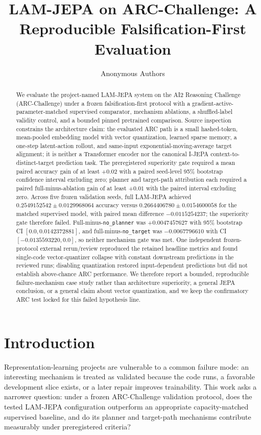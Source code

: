 \documentclass{article}
\title{LAM-JEPA on ARC-Challenge: A Reproducible Falsification-First Evaluation}
\author{Anonymous Authors}
\date{}
\begin{document}
\maketitle

\begin{abstract}
We evaluate the project-named LAM-JEPA system on the AI2 Reasoning Challenge (ARC-Challenge) under a frozen falsification-first protocol with a gradient-active-parameter-matched supervised comparator, mechanism ablations, a shuffled-label validity control, and a bounded pinned pretrained comparison. Source inspection constrains the architecture claim: the evaluated ARC path is a small hashed-token, mean-pooled embedding model with vector quantization, learned sparse memory, a one-step latent-action rollout, and same-input exponential-moving-average target alignment; it is neither a Transformer encoder nor the canonical I-JEPA context-to-distinct-target prediction task. The preregistered superiority gate required a mean paired accuracy gain of at least $+0.02$ with a paired seed-level 95\% bootstrap confidence interval excluding zero; planner and target-path attribution each required a paired full-minus-ablation gain of at least $+0.01$ with the paired interval excluding zero. Across five frozen validation seeds, full LAM-JEPA achieved $0.2549152542 \pm 0.0129968064$ accuracy versus $0.2664406780 \pm 0.0154600058$ for the matched supervised model, with paired mean difference $-0.0115254237$; the superiority gate therefore failed. Full-minus-\texttt{no\_planner} was $+0.0047457627$ with 95\% bootstrap CI $[0.0, 0.0142372881]$, and full-minus-\texttt{no\_target} was $-0.0067796610$ with CI $[-0.0135593220, 0.0]$, so neither mechanism gate was met. One independent frozen-protocol external rerun/review reproduced the retained headline metrics and found single-code vector-quantizer collapse with constant downstream predictions in the reviewed runs; disabling quantization restored input-dependent predictions but did not establish above-chance ARC performance. We therefore report a bounded, reproducible failure-mechanism case study rather than architecture superiority, a general JEPA conclusion, or a general claim about vector quantization, and we keep the confirmatory ARC test locked for this failed hypothesis line.
\end{abstract}

\section{Introduction}
Representation-learning projects are vulnerable to a common failure mode: an interesting mechanism is treated as validated because the code runs, a favorable development slice exists, or a later repair improves trainability. This work asks a narrower question: under a frozen ARC-Challenge validation protocol, does the tested LAM-JEPA configuration outperform an appropriate capacity-matched supervised baseline, and do its planner and target-path mechanisms contribute measurably under preregistered criteria?
\end{document}
